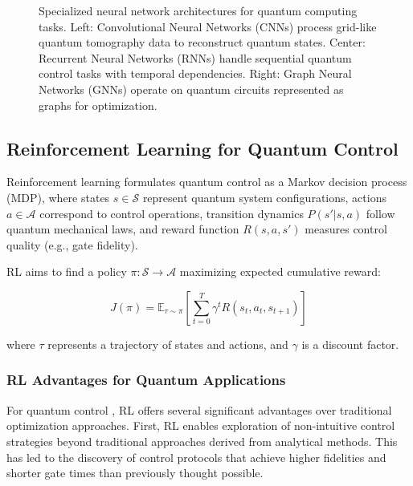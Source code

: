 \begin{figure}[!t]
\caption{Specialized neural network architectures for quantum computing tasks. Left: Convolutional Neural Networks (CNNs) process grid-like quantum tomography data to reconstruct quantum states. Center: Recurrent Neural Networks (RNNs) handle sequential quantum control tasks with temporal dependencies. Right: Graph Neural Networks (GNNs) operate on quantum circuits represented as graphs for optimization.}
\label{fig:neural_architectures}
\end{figure}

\subsection{Reinforcement Learning for Quantum Control}

Reinforcement learning formulates quantum control as a Markov decision process (MDP), where states $s \in \mathcal{S}$ represent quantum system configurations, actions $a \in \mathcal{A}$ correspond to control operations, transition dynamics $P(s'|s,a)$ follow quantum mechanical laws, and reward function $R(s,a,s')$ measures control quality (e.g., gate fidelity).

RL aims to find a policy $\pi: \mathcal{S} \rightarrow \mathcal{A}$ maximizing expected cumulative reward:

\begin{equation}
J(\pi) = \mathbb{E}_{\tau \sim \pi}\left[\sum_{t=0}^{T} \gamma^t R(s_t, a_t, s_{t+1})\right]
\end{equation}

where $\tau$ represents a trajectory of states and actions, and $\gamma$ is a discount factor.

\subsubsection{RL Advantages for Quantum Applications}

For quantum control \cite{bukov2018reinforcement}, RL offers several significant advantages over traditional optimization approaches. First, RL enables exploration of non-intuitive control strategies beyond traditional approaches derived from analytical methods. This has led to the discovery of control protocols that achieve higher fidelities and shorter gate times than previously thought possible.

